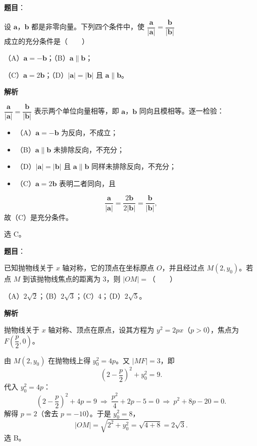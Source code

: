 \begin{answer}

\textbf{题目}：

设 $\boldsymbol a$，$\boldsymbol b$ 都是非零向量。下列四个条件中，使 $\dfrac{\boldsymbol a}{|\boldsymbol a|}=\dfrac{\boldsymbol b}{|\boldsymbol b|}$ 成立的充分条件是\mbox{（　　）}

（A）$\boldsymbol a=-\boldsymbol b$；（B）$\boldsymbol a\parallel\boldsymbol b$；

（C）$\boldsymbol a=2\boldsymbol b$；（D）$|\boldsymbol a|=|\boldsymbol b|$ 且 $\boldsymbol a\parallel\boldsymbol b$。

\textbf{解析}

$\dfrac{\boldsymbol a}{|\boldsymbol a|}=\dfrac{\boldsymbol b}{|\boldsymbol b|}$ 表示两个单位向量相等，即 $\boldsymbol a$，$\boldsymbol b$ 同向且模相等。逐一检验：

\begin{itemize}
\item （A）$\boldsymbol a=-\boldsymbol b$ 为反向，不成立；
\item （B）$\boldsymbol a\parallel\boldsymbol b$ 未排除反向，不充分；
\item （D）$|\boldsymbol a|=|\boldsymbol b|$ 且 $\boldsymbol a\parallel\boldsymbol b$ 同样未排除反向，不充分；
\item （C）$\boldsymbol a=2\boldsymbol b$ 表明二者同向，且
\end{itemize}
\nopagebreak[4]
\[\frac{\boldsymbol a}{|\boldsymbol a|}=\frac{2\boldsymbol b}{2|\boldsymbol b|}=\frac{\boldsymbol b}{|\boldsymbol b|},\]
故（C）是充分条件。

选 C。


\end{answer}
\begin{answer}

\textbf{题目}：

已知抛物线关于 $x$ 轴对称，它的顶点在坐标原点 $O$，并且经过点 $M(2,y_0)$。若点 $M$ 到该抛物线焦点的距离为 $3$，则 $|OM|=$\mbox{（　　）}

（A）$2\sqrt2$；（B）$2\sqrt3$；（C）$4$；（D）$2\sqrt5$。

\textbf{解析}

抛物线关于 $x$ 轴对称、顶点在原点，设其方程为 $y^2=2px$（$p>0$），焦点为 $F\left(\dfrac p2,0\right)$。

由 $M(2,y_0)$ 在抛物线上得 $y_0^2=4p$。又 $|MF|=3$，即
\nopagebreak[4]
\[\left(2-\frac p2\right)^2+y_0^2=9.\]
代入 $y_0^2=4p$：
\nopagebreak[4]
\[\left(2-\frac p2\right)^2+4p=9\ \Longrightarrow\ \frac{p^2}4+2p-5=0\ \Longrightarrow\ p^2+8p-20=0.\]
解得 $p=2$（舍去 $p=-10$）。于是 $y_0^2=8$，
\nopagebreak[4]
\[|OM|=\sqrt{2^2+y_0^2}=\sqrt{4+8}=2\sqrt3.\]
选 B。


\end{answer}

